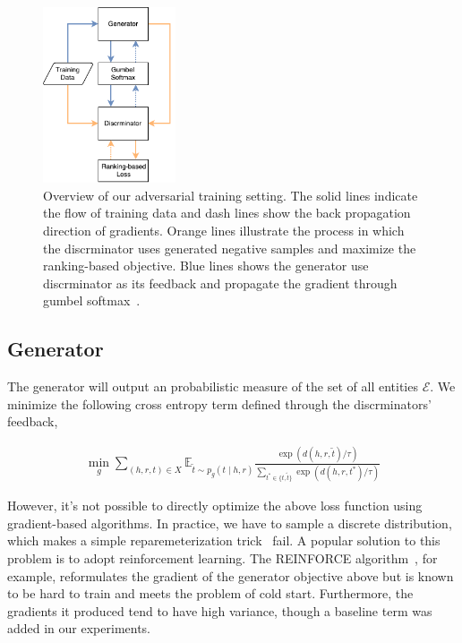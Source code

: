\documentclass[twocolumn,a4paper,10pt,review,5p]{elsarticle}
\begin{document}
\begin{figure}[t]
    \centering
    \includegraphics[width=0.35\textwidth]{images/overview.pdf}
    \caption{Overview of our adversarial training setting. The solid lines indicate the flow of training data and dash lines show the back propagation direction of gradients. Orange lines illustrate the process in which the discrminator uses generated negative samples and maximize the ranking-based objective. Blue lines shows the generator use discrminator as its feedback and propagate the gradient through gumbel softmax~\cite{GumbelSoftmax_Jiang_2016}.}
\label{system-overview}
\end{figure}


\subsection{Generator}

The generator will output an probabilistic measure of the set of all entities $\mathcal{E}$. We minimize the following cross entropy term defined through the discrminators' feedback,

\begin{align*}
    \min_g \sum_{(h, r, t)\in X}
        \mathbb{E}_{\tilde t \sim p_g(t \mid h, r)}
            \frac{\exp(d(h, r, \tilde t) / \tau)}
                 {\sum_{t^* \in \{ t, \tilde t\}} \exp(d(h, r, t^*) / \tau)}
\end{align*}

However, it's not possible to directly optimize the above loss function using gradient-based algorithms. In practice, we have to sample a discrete distribution, which makes a simple reparemeterization trick~\cite{VAE} fail. A popular solution to this problem is to adopt reinforcement learning. The REINFORCE algorithm~\cite{Williams_1992}, for example, reformulates the gradient of the generator objective above but is known to be hard to train and meets the problem of cold start. Furthermore, the gradients it produced tend to have high variance, though a baseline term was added in our experiments.
\end{document}
